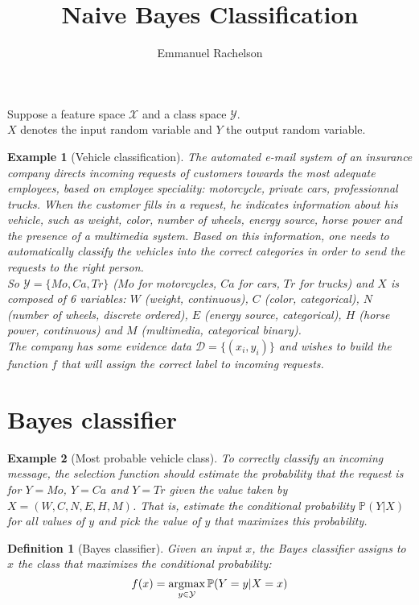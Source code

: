 \documentclass{article}
\author{Emmanuel Rachelson}
\title{Naive Bayes Classification}
\date{}
\newtheorem*{definition}{Definition}
\newtheorem*{example}{Example}
\newcommand{\argmax}{\operatornamewithlimits{argmax}}
\begin{document}
\maketitle

\noindent Suppose a feature space $\mathcal{X}$ and a class space $\mathcal{Y}$.\\
$X$ denotes the input random variable and $Y$ the output random variable.\\
\begin{example}[Vehicle classification]
The automated e-mail system of an insurance company directs incoming requests of customers towards the most adequate employees, based on employee speciality: motorcycle, private cars, professionnal trucks. When the customer fills in a request, he indicates information about his vehicle, such as weight, color, number of wheels, energy source, horse power and the presence of a multimedia system. Based on this information, one needs to automatically classify the vehicles into the correct categories in order to send the requests to the right person.\\
So $\mathcal{Y}=\{Mo,Ca,Tr\}$ ($Mo$ for motorcycles, $Ca$ for cars, $Tr$ for trucks) and $X$ is composed of 6 variables: $W$ (weight, continuous), $C$ (color, categorical), $N$ (number of wheels, discrete ordered), $E$ (energy source, categorical), $H$ (horse power, continuous) and $M$ (multimedia, categorical binary).\\
The company has some evidence data $\mathcal{D}=\{(x_i, y_i)\}$ and wishes to build the function $f$ that will assign the correct label to incoming requests.
\end{example}

\section*{Bayes classifier}

\begin{example}[Most probable vehicle class]
To correctly classify an incoming message, the selection function should estimate the probability that the request is for $Y=Mo$, $Y=Ca$ and $Y=Tr$ given the value taken by $X=(W,C,N,E,H,M)$. That is, estimate the conditional probability $\mathbb{P}(Y|X)$ for all values of $y$ and pick the value of $y$ that maximizes this probability.
\end{example}

\begin{definition}[Bayes classifier]
Given an input $x$, the Bayes classifier assigns to $x$ the class that maximizes the conditional probability:
\begin{equation*}
f(x) = \argmax_{y \in \mathcal{Y}} \mathbb{P}(Y=y|X=x)
\end{equation*}
\end{definition}
\end{document}
